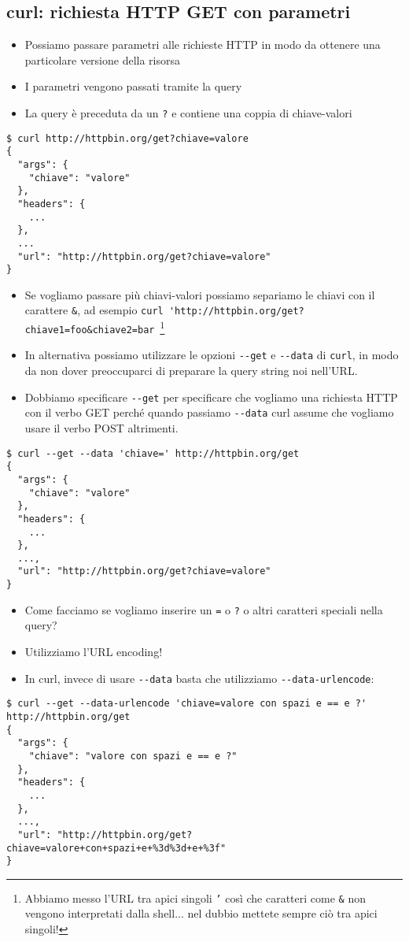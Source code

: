 \documentclass{beamer}
\newcommand{\code}[1]{\mbox{\texttt{#1}}}
\newcommand{\command}[1]{\mbox{\texttt{#1}}}
\begin{document}
\subsection*{curl: richiesta HTTP GET con parametri}
\begin{frame}{\insertsection}{\insertsubsection}
\begin{itemize}
\item Possiamo passare parametri alle richieste HTTP in modo da ottenere una
particolare versione della risorsa
\item I parametri vengono passati tramite la \alert{query}
\item La query è preceduta da un \code{?} e contiene una coppia di
chiave-valori
\end{itemize}
{\tiny
\begin{verbatim}
$ curl http://httpbin.org/get?chiave=valore
{
  "args": {
    "chiave": "valore"
  },
  "headers": {
    ...
  },
  ...
  "url": "http://httpbin.org/get?chiave=valore"
}
\end{verbatim}
}
\begin{itemize}
\item Se vogliamo passare più chiavi-valori possiamo separiamo le chiavi con il
carattere \code{\&}, ad esempio
\small{\verb|curl 'http://httpbin.org/get?chiave1=foo&chiave2=bar|}~\footnote{Abbiamo
messo l'URL tra apici singoli \code{'} così che caratteri come
\code{\&} non vengono interpretati dalla shell... nel dubbio
mettete sempre ciò tra apici singoli!}
\item In alternativa possiamo utilizzare le opzioni \verb|--get| e \verb|--data|
di \command{curl}, in modo da non dover preoccuparci di preparare la query
string noi nell'URL.
\item Dobbiamo specificare \verb|--get| per specificare che vogliamo una
richiesta HTTP con il verbo GET perché quando passiamo \verb|--data|
curl assume che vogliamo usare il verbo POST altrimenti.
\end{itemize}
{\tiny
\begin{verbatim}
$ curl --get --data 'chiave=' http://httpbin.org/get
{
  "args": {
    "chiave": "valore"
  },
  "headers": {
    ...
  },
  ...,
  "url": "http://httpbin.org/get?chiave=valore"
}
\end{verbatim}
}
\begin{itemize}
\item Come facciamo se vogliamo inserire un \code{=} o \code{?} o altri
caratteri speciali nella query?
\item Utilizziamo l'\alert{URL encoding}!
\item In curl, invece di usare \verb|--data| basta che utilizziamo
\verb|--data-urlencode|:
\end{itemize}
{\tiny
\begin{verbatim}
$ curl --get --data-urlencode 'chiave=valore con spazi e == e ?' http://httpbin.org/get
{
  "args": {
    "chiave": "valore con spazi e == e ?"
  },
  "headers": {
    ...
  },
  ...,
  "url": "http://httpbin.org/get?chiave=valore+con+spazi+e+%3d%3d+e+%3f"
}
\end{verbatim}
}
\end{frame}
\end{document}
